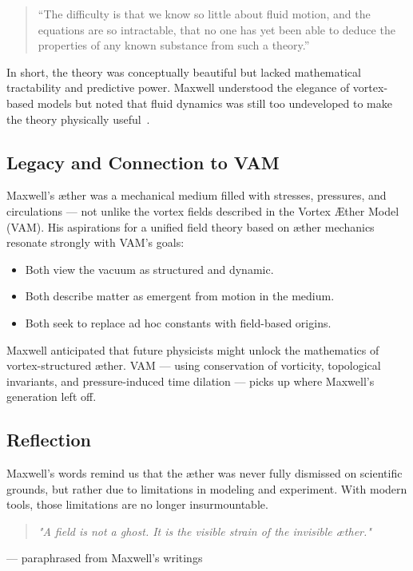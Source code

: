  \begin{quote}
 ``The difficulty is that we know so little about fluid motion, and the equations are so intractable, that no one has yet been able to deduce the properties of any known substance from such a theory.''
 \end{quote}

 In short, the theory was conceptually beautiful but lacked mathematical tractability and predictive power. Maxwell understood the elegance of vortex-based models but noted that fluid dynamics was still too undeveloped to make the theory physically useful~\cite{maxwell1875molecules}.

 \subsection*{Legacy and Connection to VAM}

 Maxwell's æther was a mechanical medium filled with stresses, pressures, and circulations — not unlike the vortex fields described in the Vortex Æther Model (VAM). His aspirations for a unified field theory based on æther mechanics resonate strongly with VAM's goals:

 \begin{itemize}
   \item Both view the vacuum as structured and dynamic.
   \item Both describe matter as emergent from motion in the medium.
   \item Both seek to replace ad hoc constants with field-based origins.
 \end{itemize}

 Maxwell anticipated that future physicists might unlock the mathematics of vortex-structured æther. VAM — using conservation of vorticity, topological invariants, and pressure-induced time dilation — picks up where Maxwell's generation left off.

 \subsection*{Reflection}

 Maxwell's words remind us that the æther was never fully dismissed on scientific grounds, but rather due to limitations in modeling and experiment. With modern tools, those limitations are no longer insurmountable.

 \begin{quote}
 \textit{"A field is not a ghost. It is the visible strain of the invisible æther."}
 \end{quote}
 \hfill  — paraphrased from Maxwell's writings